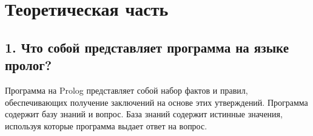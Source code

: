 \documentclass[12pt]{report}
\begin{document}

\chapter*{Теоретическая часть}

\section*{1. Что собой представляет программа на языке пролог?}

Программа на Prolog представляет собой набор фактов и правил, обеспечивающих получение заключений на основе этих утверждений. Программа содержит базу знаний и вопрос. База знаний содержит истинные значения, используя которые программа выдает ответ на вопрос. 
\end{document}
